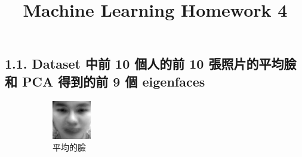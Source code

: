 \documentclass[fleqn,a4paper,12pt]{article}
\title{Machine Learning Homework 4}
\date{}
\begin{document}
\thispagestyle{fancy}

\subsection*{1.1. Dataset 中前 10 個人的前 10 張照片的平均臉和 PCA 得到的前 9 個 eigenfaces}

\begin{figure}[H]
\centering
\begin{subfigure}{.1\textwidth}
  \centering
  \includegraphics[width=\linewidth]{problem1/avg-face.png}
  \caption{平均的臉}
  \label{fig:sub1}
\end{subfigure}%
\begin{subfigure}{.3\textwidth}
  \centering

\end{subfigure}
\end{figure}
\end{document}
